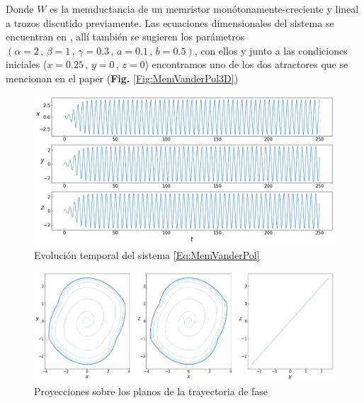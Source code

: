 \documentclass[11pt,letterpaper]{article}
\begin{document}
\begin{multicols*}{2}
Donde $W$ es la memductancia de un memristor monótonamente-creciente y lineal a trozos discutido previamente. Las ecuaciones dimensionales del sistema se encuentran en \cite{Itoh2008}, allí también se sugieren los parámetros $(\alpha\!=\!2 \,,\, \beta\!=\!1 \,,\, \gamma\!=\!0.3 \,,\, a\!=\!0.1 \,,\, b\!=\!0.5)$, con ellos y junto a las condiciones iniciales ($x\!=\!0.25\,,\,y\!=\!0\,,\,z\!=\!0$) encontramos uno de los dos atractores que se mencionan en el paper (\textbf{Fig.} \ref{Fig:MemVanderPol3D})

\begin{figure}[H]
    \centering
    \includegraphics[scale=0.245]{Memristor-basedVanderPolOscillator1D.png}
    \caption{Evolución temporal del sistema \ref{Eq:MemVanderPol}}
    \label{Fig:MemVanderPol1D}
\end{figure}

\begin{figure}[H]
    \centering
    \includegraphics[scale=0.205]{Memristor-basedVanderPolOscillator2D.png}
    \caption{Proyecciones sobre los planos de la trayectoria de fase}
    \label{Fig:MemVanderPol2D}
\end{figure}


\end{multicols*}
\end{document}
